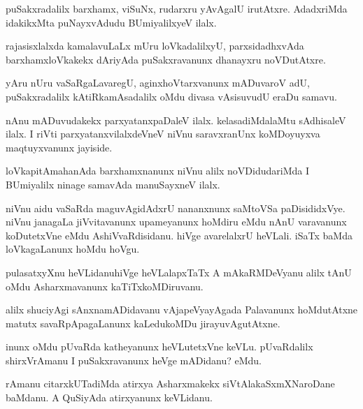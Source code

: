 \begin{mng}
puSakxradalilx barxhamx, viSuNx, rudarxru yAvAgalU irutAtxre. AdadxriMda idakikxMta puNayxvAdudu BUmiyalilxyeV ilalx.
\end{mng}

\begin{mng}
rajasisxlalxda kamalavuLaLx mUru loVkadalilxyU, parxsidadhxvAda barxhamxloVkakekx dAriyAda puSakxravanunx dhanayxru noVDutAtxre.
\end{mng}

\begin{mng}
yAru nUru vaSaRgaLavaregU, aginxhoVtarxvanunx mADuvaroV adU, puSakxradalilx kAtiRkamAsadalilx oMdu divasa vAsisuvudU eraDu samavu.
\end{mng}

\begin{mng}
nAnu mADuvudakekx parxyatanxpaDaleV ilalx. kelasadiMdalaMtu sAdhisaleV ilalx. I riVti parxyatanxvilalxdeVneV niVnu saravxranUnx koMDoyuyxva maqtuyxvanunx jayiside.
\end{mng}

\begin{mng}
loVkapitAmahanAda barxhamxnanunx niVnu alilx noVDidudariMda I BUmiyalilx ninage samavAda manuSayxneV ilalx.
\end{mng}

\begin{mng}
niVnu aidu vaSaRda maguvAgidAdxrU nananxnunx saMtoVSa paDisididxVye. niVnu janagaLa jiVvitavanunx upameyanunx hoMdiru eMdu nAnU varavanunx koDutetxVne eMdu AshiVvaRdisidanu. hiVge avarelalxrU heVLali. iSaTx baMda loVkagaLanunx hoMdu hoVgu.
\end{mng}

\begin{mng}
pulasatxyXnu heVLidanu\mdash hiVge heVLalapxTaTx A mAkaRMDeVyanu alilx tAnU oMdu Asharxmavanunx kaTiTxkoMDiruvanu.
\end{mng}

\begin{mng}
alilx shuciyAgi sAnxnamADidavanu vAjapeVyayAgada Palavanunx hoMdutAtxne matutx savaRpApagaLanunx kaLedukoMDu jirayuvAgutAtxne.
\end{mng}

\begin{mng}
inunx oMdu pUvaRda katheyanunx heVLutetxVne keVLu. pUvaRdalilx shirxVrAmanu I puSakxravanunx heVge mADidanu? eMdu.
\end{mng}

\begin{mng}
rAmanu citarxkUTadiMda atirxya Asharxmakekx siVtAlakaSxmXNaroDane baMdanu. A QuSiyAda atirxyanunx keVLidanu.
\end{mng}

